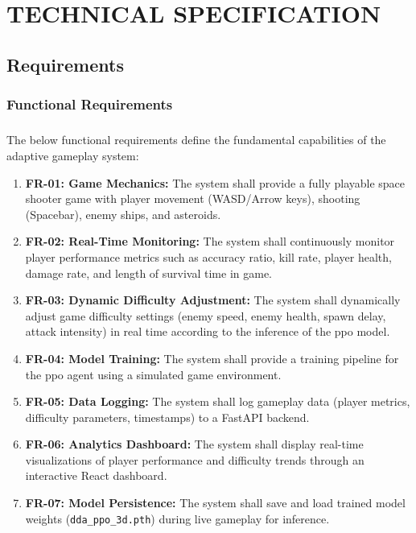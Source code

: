 \chapter{\MakeUppercase{Technical Specification}}
\justifying
\section{Requirements}

\subsection{Functional Requirements}
\paragraph{} The below functional requirements define the fundamental capabilities of the adaptive gameplay system:

\begin{enumerate}
	\item \textbf{FR-01: Game Mechanics:} The system shall provide a fully playable space shooter game with player movement (WASD/Arrow keys), shooting (Spacebar), enemy ships, and asteroids.
	\item \textbf{FR-02: Real-Time Monitoring:} The system shall continuously monitor player performance metrics such as accuracy ratio, kill rate, player health, damage rate, and length of survival time in game.
	\item \textbf{FR-03: Dynamic Difficulty Adjustment:} The system shall dynamically adjust game difficulty settings (enemy speed, enemy health, spawn delay, attack intensity) in real time according to the inference of the \ac{ppo} model.
	\item \textbf{FR-04: Model Training:} The system shall provide a training pipeline for the \ac{ppo} agent using a simulated game environment.
	\item \textbf{FR-05: Data Logging:} The system shall log gameplay data (player metrics, difficulty parameters, timestamps) to a FastAPI backend.
	\item \textbf{FR-06: Analytics Dashboard:} The system shall display real-time visualizations of player performance and difficulty trends through an interactive React dashboard.
	\item \textbf{FR-07: Model Persistence:} The system shall save and load trained model weights (\texttt{dda\_ppo\_3d.pth}) during live gameplay for inference.
\end{enumerate}

